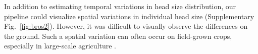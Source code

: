 In addition to estimating temporal variations in head size distribution, our pipeline could visualize spatial variations in individual head size (Supplementary Fig.~\ref{fig:bros2}). 
However, it was difficult to visually observe the differences on the ground. 
Such a spatial variation can often occur on field-grown crops, especially in large-scale agriculture \citep{quine_investigation_2002}. %

